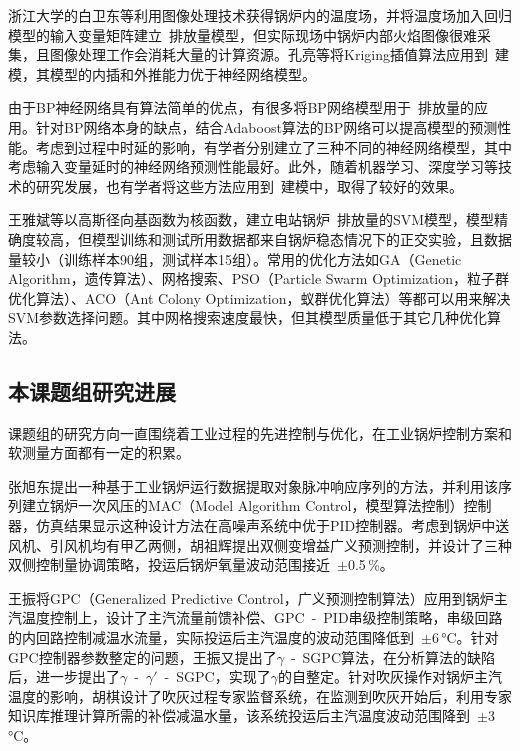 浙江大学的白卫东等利用图像处理技术获得锅炉内的温度场，并将温度场加入回归模型的输入变量矩阵建立~排放量模型，但实际现场中锅炉内部火焰图像很难采集，且图像处理工作会消耗大量的计算资源\cite{白卫东2004统计回归方法在电站锅炉氮氧化物排放量监测中的应用}。孔亮等将Kriging插值算法应用到~建模，其模型的内插和外推能力优于神经网络模型\cite{孔亮2008基于}。

由于BP神经网络具有算法简单的优点，有很多将BP网络模型用于~排放量的应用。针对BP网络本身的缺点，结合Adaboost算法的BP网络可以提高模型的预测性能。考虑到过程中时延的影响，有学者分别建立了三种不同的神经网络模型，其中考虑输入变量延时的神经网络预测性能最好\cite{Li2003Neural}。此外，随着机器学习、深度学习等技术的研究发展，也有学者将这些方法应用到~建模中，取得了较好的效果\cite{li2016prediction}。

王雅斌等以高斯径向基函数为核函数，建立电站锅炉~排放量的SVM模型，模型精确度较高，但模型训练和测试所用数据都来自锅炉稳态情况下的正交实验，且数据量较小（训练样本90组，测试样本15组）。常用的优化方法如GA（Genetic Algorithm，遗传算法）、网格搜索、PSO（Particle Swarm Optimization，粒子群优化算法）、ACO（Ant Colony Optimization，蚁群优化算法）等都可以用来解决SVM参数选择问题。其中网格搜索速度最快，但其模型质量低于其它几种优化算法\cite{王雅彬2012基于支持向量机的电站锅炉}。

\subsection{本课题组研究进展}

课题组的研究方向一直围绕着工业过程的先进控制与优化，在工业锅炉控制方案和软测量方面都有一定的积累。

张旭东提出一种基于工业锅炉运行数据提取对象脉冲响应序列的方法，并利用该序列建立锅炉一次风压的MAC（Model Algorithm Control，模型算法控制）控制器，仿真结果显示这种设计方法在高噪声系统中优于PID控制器\cite{薛美盛2012电站锅炉一次风压系统模型算法控制仿真研究}。考虑到锅炉中送风机、引风机均有甲乙两侧，胡祖辉提出双侧变增益广义预测控制，并设计了三种双侧控制量协调策略，投运后锅炉氧量波动范围接近~$\pm$0.5$\,$\si{\percent}\cite{胡祖辉2015母管制锅炉先进控制策略研究及应用}。

王振将GPC（Generalized Predictive Control，广义预测控制算法）应用到锅炉主汽温度控制上，设计了主汽流量前馈补偿、GPC~-~PID串级控制策略，串级回路的内回路控制减温水流量，实际投运后主汽温度的波动范围降低到~$\pm$6$\,$\si{\degreeCelsius}。针对GPC控制器参数整定的问题，王振又提出了$\gamma$~-~SGPC算法，在分析算法的缺陷后，进一步提出了$\gamma$~-~${\gamma}'$~-~SGPC，实现了$\gamma$的自整定\cite{王振2012基于负荷前馈补偿的主汽温串级广义预测控制,樊培利2011改进的γ一}。针对吹灰操作对锅炉主汽温度的影响，胡棋设计了吹灰过程专家监督系统，在监测到吹灰开始后，利用专家知识库推理计算所需的补偿减温水量，该系统投运后主汽温度波动范围降到~$\pm$3$\,$\si{\degreeCelsius}\cite{胡棋2014基于吹灰专家监督系统的主汽温度广义预测控制}。

